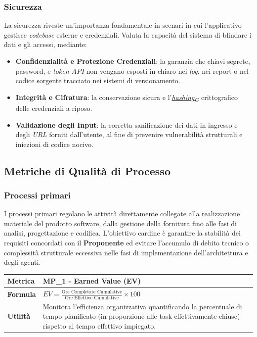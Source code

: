 \documentclass[12pt, a4paper]{article}
\newcommand{\urlglossario}{https://skynetunigroup.github.io/Code_Guardian/Documentazione/RTB/glossario_v1.0.0.pdf} %
\newcommand{\glo}[2]{\href{\urlglossario\#nameddest=#2}{#1\textsubscript{G}}}
\begin{document}
\subsubsection{Sicurezza}
La sicurezza riveste un'importanza fondamentale in scenari in cui l'applicativo gestisce \textit{codebase} esterne e credenziali. Valuta la capacità del sistema di blindare i dati e gli accessi, mediante:
\begin{itemize}
    \item \textbf{Confidenzialità e Protezione Credenziali}: la garanzia che chiavi segrete, password, e \textit{token API} non vengano esposti in chiaro nei \textit{log}, nei report o nel codice sorgente tracciato nei sistemi di versionamento.
    \item \textbf{Integrità e Cifratura}: la conservazione sicura e l'\textit{\glo{hashing}{hash}} crittografico delle credenziali a riposo.
    \item \textbf{Validazione degli Input}: la corretta sanificazione dei dati in ingresso e degli \textit{URL} forniti dall'utente, al fine di prevenire vulnerabilità strutturali e iniezioni di codice nocivo.
\end{itemize}

\subsection{Metriche di Qualità di Processo}

\subsubsection{Processi primari}
I processi primari regolano le attività direttamente collegate alla realizzazione materiale del prodotto software, dalla gestione della fornitura fino alle fasi di analisi, progettazione e codifica. L'obiettivo cardine è garantire la stabilità dei requisiti concordati con il \textbf{Proponente} ed evitare l'accumulo di debito tecnico o complessità strutturale eccessiva nelle fasi di implementazione dell'architettura e degli agenti.


\begin{table}[H]
\centering
\renewcommand{\arraystretch}{1.5}
\begin{tabular}{|l|p{12cm}|}
\hline
\textbf{Metrica} & MP\_1 - Earned Value (EV) \\ \hline
\textbf{Formula} & \( EV = \frac{\text{Ore Completate Cumulative}}{\text{Ore Effettive Cumulative}} \times 100 \) \\ \hline
\textbf{Utilità} & Monitora l'efficienza organizzativa quantificando la percentuale di tempo pianificato (in proporzione alle task effettivamente chiuse) rispetto al tempo effettivo impiegato. \\ \hline
\end{tabular}
\end{table}
\end{document}
